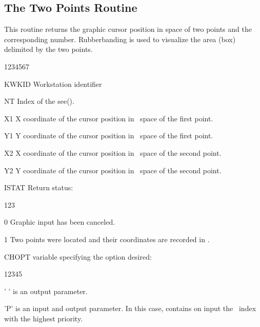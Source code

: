 \subsection{The Two Points Routine}
\Action
This routine returns the graphic cursor position in \WC{} space of two points
and the corresponding \NT{} number. Rubberbanding is used to visualize the area
(box) delimited by the two points.
\Pdesc
\begin{DLtt}{1234567}
\item[KWKID] Workstation identifier
\item[NT] Index of the \NT see{}().
\item[X1] X coordinate of the cursor position in \WC~space of the first point.
\item[Y1] Y coordinate of the cursor position in \WC~space of the first point.
\item[X2] X coordinate of the cursor position in \WC~space of the second point.
\item[Y2] Y coordinate of the cursor position in \WC~space of the second point.
\item[ISTAT] Return status:
\begin{DLtt}{123}
\item[0] Graphic input has been canceled.
\item[1] Two points were located and their coordinates are recorded in
         .
\end{DLtt}
\item[CHOPT]  variable specifying the option desired:
\begin{DLtt}{12345}
\item[' ']  is an output parameter.
\item['P']  is an input and output parameter. In this case,
            contains on input the \NT~index with the highest priority.
\end{DLtt}
\end{DLtt}
 
